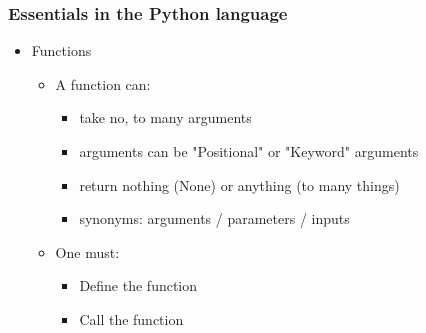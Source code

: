 \begin{frame}\frametitle{Essentials in the Python language}
   \begin{itemize}
      \item Functions
      \begin{itemize}
         \item A function can:
         \begin{itemize}
            \item take no, to many arguments
            \item arguments can be "Positional" or "Keyword" arguments
            \item return nothing (None) or anything (to many things)
            \item synonyms: arguments / parameters / inputs
         \end{itemize}
         \item One must:
         \begin{itemize}
            \item Define the function
            \item Call the function
         \end{itemize}
      \end{itemize}
   \end{itemize}
\end{frame}



